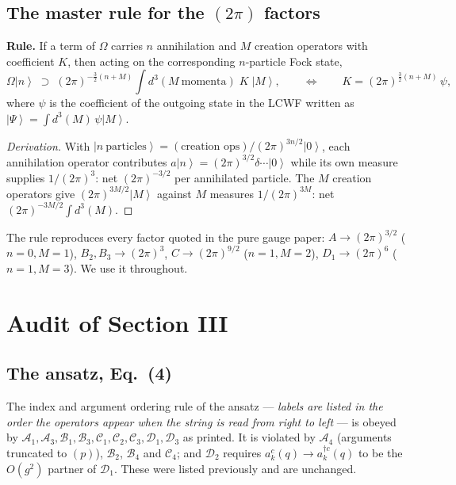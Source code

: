 \documentclass[11pt]{article}
\newcommand{\dg}{\dagger}
\newcommand{\ket}[1]{\left|#1\right\rangle}
\newcommand{\vac}{\ket{0}}
\newcommand{\OM}{\Omega}
\begin{document}
\subsection{The master rule for the $(2\pi)$ factors}

\begin{res}
\textbf{Rule.} If a term of $\OM$ carries $n$ annihilation and $M$ creation operators with
coefficient $K$, then acting on the corresponding $n$-particle Fock state,
\begin{equation}
\OM\ket{n}\;\supset\;(2\pi)^{-\frac32(n+M)}\!\int\! d^{3}(M\ \text{momenta})\;K\;\ket{M},
\qquad\Longleftrightarrow\qquad
K=(2\pi)^{\frac32(n+M)}\,\psi,
\label{eq:rule}
\end{equation}
where $\psi$ is the coefficient of the outgoing state in the LCWF written as
$\ket{\Psi}=\int d^{3}(M)\,\psi\ket{M}$.
\end{res}

\begin{proof}[Derivation]
With $\ket{n\ \text{particles}}=(\text{creation ops})/(2\pi)^{3n/2}\vac$, each annihilation
operator contributes $a\ket{n}=(2\pi)^{3/2}\delta\cdots\vac$ while its own measure supplies
$1/(2\pi)^{3}$: net $(2\pi)^{-3/2}$ per annihilated particle. The $M$ creation operators give
$(2\pi)^{3M/2}\ket{M}$ against $M$ measures $1/(2\pi)^{3M}$: net
$(2\pi)^{-3M/2}\int d^{3}(M)$.
\end{proof}

\noindent
The rule reproduces every factor quoted in the pure gauge paper:
$A\to(2\pi)^{3/2}$ ($n{=}0,M{=}1$), $B_{2},B_{3}\to(2\pi)^{3}$, $C\to(2\pi)^{9/2}$
($n{=}1,M{=}2$), $D_{1}\to(2\pi)^{6}$ ($n{=}1,M{=}3$). We use it throughout.

\section{Audit of Section III}

\subsection{The ansatz, Eq.~(4)}

The index and argument ordering rule of the ansatz --- \emph{labels are listed in the order the
operators appear when the string is read from right to left} --- is obeyed by
$\mathcal A_1,\mathcal A_3,\mathcal B_1,\mathcal B_3,\mathcal C_1,\mathcal C_2,\mathcal C_3,
\mathcal D_1,\mathcal D_3$ as printed. It is violated by $\mathcal A_4$ (arguments truncated to
$(p)$), $\mathcal B_2$, $\mathcal B_4$ and $\mathcal C_4$; and $\mathcal D_2$ requires
$a^{c}_{k}(q)\to a^{\dg c}_{k}(q)$ to be the $O(g^{2})$ partner of $\mathcal D_1$. These were
listed previously and are unchanged.
\end{document}

